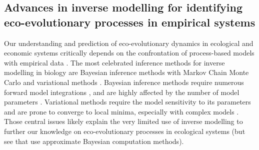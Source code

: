 \subsection{Advances in inverse modelling for identifying eco-evolutionary processes in empirical systems}

Our understanding and prediction of eco-evolutionary dynamics in ecological and economic systems critically depends on the confrontation of process-based models with empirical data \citep{Pelletier2009,Hidalgo2021}.
% 
The most celebrated inference methods for inverse modelling in biology are Bayesian inference methods with Markov Chain Monte Carlo \citep{Lignell2013,Higgins2010,Xu2006,Fiechter2013,Rosenbaum2019} and variational methods \citep{Schartau2017}.
% 
Bayesian inference methods require numerous forward model integrations \citep{Schneider2017}, and are highly affected by the number of model parameters \citep{Csillery2010}.
% 
Variational methods require the model sensitivity to its parameters \citep{Schartau2017} and are prone to converge to local minima, especially with complex models \citep{Gabor2015}.
% 
Those central issues likely explain the very limited use of inverse modelling to further our knowledge on eco-evolutionary processes in ecological systems (but see \cite{Sukumaran2016,Skeels2019,Skeels2022} that use approximate Bayesian computation methods). 

